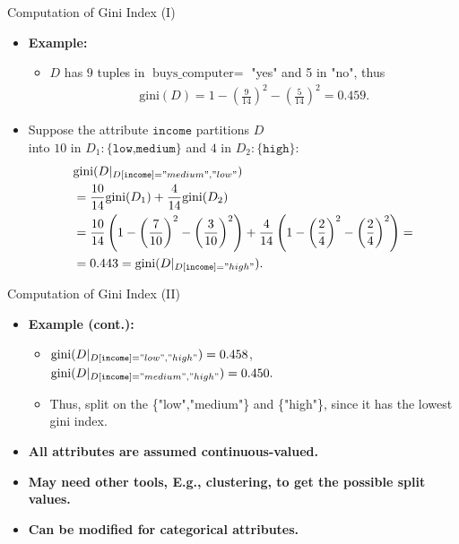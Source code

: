 \begin{frame}{Computation of Gini Index (I)}
	\begin{itemize}
		\item \textbf{Example:}
		      \begin{itemize}
			      \item $D$ has $9$ tuples in $\text{buys\_computer} =$ "yes" and 5 in "no", thus
			            \begin{align}
				            \text{gini}(D) = 1 - \left( \frac{9}{14} \right)^2 - \left( \frac{5}{14} \right)^2 = 0.459.
			            \end{align}
		      \end{itemize}
		\item Suppose the attribute $\texttt{income}$ partitions $D$ \\ into $10$ in $D_1:\{\texttt{low,medium}\}$ and $4$ in $D_2: \{\texttt{high}\}$:
		      \begin{align}
			       & \text{gini}(D\vert_{D[\texttt{income}]="medium", "low"})                                                                                                                                   \\
			       & = \frac{10}{14} \text{gini}(D_1) + \frac{4}{14} \text{gini}(D_2)                                                                                                                           \\
			       & =\frac{10}{14} \left(1-\left( \frac{7}{10} \right)^2 - \left( \frac{3}{10} \right)^2 \right) + \frac{4}{14} \left( 1-\left( \frac{2}{4} \right)^2 - \left( \frac{2}{4} \right)^2 \right) = \\
			       & = 0.443 = \text{gini}(D\vert_{D[\texttt{income}]="high"}).
		      \end{align}
	\end{itemize}
\end{frame}

\begin{frame}{Computation of Gini Index (II)}
	\begin{itemize}
		\item \textbf{Example (cont.):}
		      \begin{itemize}
			      \item $\text{gini}(D\vert_{D[\texttt{income}]="low", "high"}) = 0.458$,\\
			            $\text{gini}(D\vert_{D[\texttt{income}]="medium", "high"}) = 0.450.$
			      \item Thus, split on the \{"low","medium"\} and \{"high"\}, since it has the lowest gini index.
		      \end{itemize}
		\item \textbf{All attributes are assumed continuous-valued.}
		\item \textbf{May need other tools, E.g., clustering, to get the possible split values.}
		\item \textbf{Can be modified for categorical attributes.}
	\end{itemize}
\end{frame}

